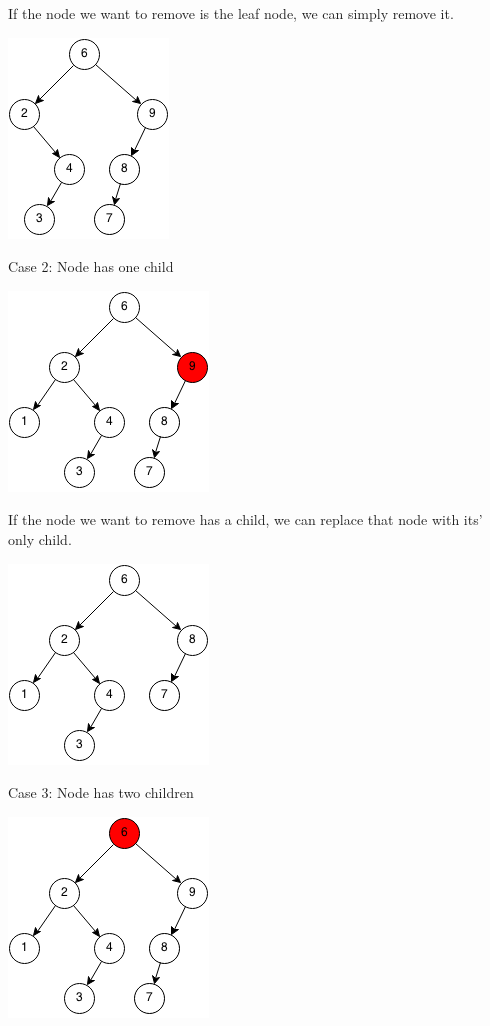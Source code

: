\documentclass[11pt,oneside]{book}
\makeatletter
\def\maxwidth#1{\ifdim\Gin@nat@width>#1 #1\else\Gin@nat@width\fi}
\makeatother
\begin{document}
If the node we want to remove is the leaf node, we can simply remove it.

\includegraphics[width=\maxwidth{\textwidth}]{bst-rem-case12.png}

Case 2: Node has one child

\includegraphics[width=\maxwidth{\textwidth}]{bst-rem-case21.png}

If the node we want to remove has a child, we can replace that node with its' only child.

\includegraphics[width=\maxwidth{\textwidth}]{bst-rem-case22.png}

Case 3: Node has two children

\includegraphics[width=\maxwidth{\textwidth}]{bst-rem-case31.png}
\end{document}
